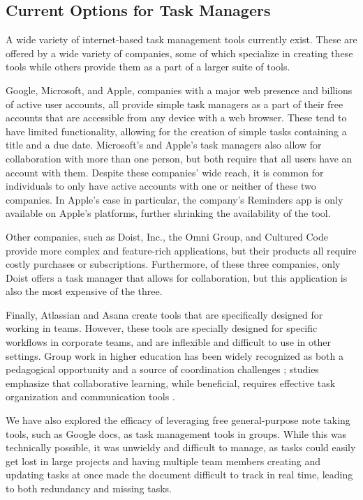 \documentclass[11pt,oneside]{article}
\begin{document}
\subsection{Current Options for Task Managers}
A wide variety of internet-based task management tools currently exist. These are offered by a wide variety of companies, some of which specialize in creating these tools while others provide them as a part of a larger suite of tools.

Google, Microsoft, and Apple, companies with a major web presence and billions of active user accounts, all provide simple task managers as a part of their free accounts that are accessible from any device with a web browser. These tend to have limited functionality, allowing for the creation of simple tasks containing a title and a due date. Microsoft’s and Apple’s task managers also allow for collaboration with more than one person, but both require that all users have an account with them. Despite these companies’ wide reach, it is common for individuals to only have active accounts with one or neither of these two companies. In Apple’s case in particular, the company’s Reminders app is only available on Apple’s platforms, further shrinking the availability of the tool.


Other companies, such as Doist, Inc., the Omni Group, and Cultured Code provide more complex and feature-rich applications, but their products all require costly purchases or subscriptions. Furthermore, of these three companies, only Doist offers a task manager that allows for collaboration, but this application is also the most expensive of the three.

Finally, Atlassian and Asana create tools that are specifically designed for working in teams. However, these tools are specially designed for specific workflows in corporate teams, and are inflexible and difficult to use in other settings. Group work in higher education has been widely recognized as both a pedagogical opportunity and a source of coordination challenges \citep{johnson2009educational}; studies emphasize that collaborative learning, while beneficial, requires effective task organization and communication tools \citep{dunlosky2013improving}.

We have also explored the efficacy of leveraging free general-purpose note taking tools, such as Google docs, as task management tools in groups. While this was technically possible, it was unwieldy and difficult to manage, as tasks could easily get lost in large projects and having multiple team members creating and updating tasks at once made the document difficult to track in real time, leading to both redundancy and missing tasks.
\end{document}
